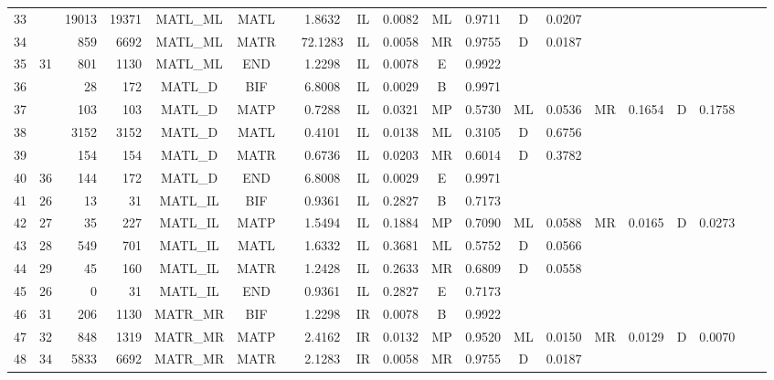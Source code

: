 \begin{table}
\begin{center}
\begin{tabular}{|rr|rr|cc|c|c|cc|cc|cc|cc|cc|cc|}
33  &    & 19013 & 19371 & MATL\_ML & MATL & & 1.8632  & IL & 0.0082 & ML & 0.9711 & D  & 0.0207 &    &        &    &  &  &  \\  
34  &    & 859   & 6692  & MATL\_ML & MATR & & 72.1283 & IL & 0.0058 & MR & 0.9755 & D  & 0.0187 &    &        &    &  &  &  \\  
35  & 31 & 801   & 1130  & MATL\_ML & END  & & 1.2298  & IL & 0.0078 & E  & 0.9922 &    &        &    &        &    &  &  &  \\  
36  &    & 28    & 172   & MATL\_D  & BIF  & & 6.8008  & IL & 0.0029 & B  & 0.9971 &    &        &    &        &    &  &  &  \\  
37  &    & 103   & 103   & MATL\_D  & MATP & & 0.7288  & IL & 0.0321 & MP & 0.5730 & ML & 0.0536 & MR & 0.1654 & D  & 0.1758 &  &  \\  
38  &    & 3152  & 3152  & MATL\_D  & MATL & & 0.4101  & IL & 0.0138 & ML & 0.3105 & D  & 0.6756 &    &        &    &  &  &  \\  
39  &    & 154   & 154   & MATL\_D  & MATR & & 0.6736  & IL & 0.0203 & MR & 0.6014 & D  & 0.3782 &    &        &    &  &  &  \\  
40  & 36 & 144   & 172   & MATL\_D  & END  & & 6.8008  & IL & 0.0029 & E  & 0.9971 &    &        &    &        &    &  &  &  \\  
41  & 26 & 13    & 31    & MATL\_IL & BIF  & & 0.9361  & IL & 0.2827 & B  & 0.7173 &    &        &    &        &    &  &  &  \\  
42  & 27 & 35    & 227   & MATL\_IL & MATP & & 1.5494  & IL & 0.1884 & MP & 0.7090 & ML & 0.0588 & MR & 0.0165 & D  & 0.0273 &  &  \\  
43  & 28 & 549   & 701   & MATL\_IL & MATL & & 1.6332  & IL & 0.3681 & ML & 0.5752 & D  & 0.0566 &    &        &    &  &  &  \\  
44  & 29 & 45    & 160   & MATL\_IL & MATR & & 1.2428  & IL & 0.2633 & MR & 0.6809 & D  & 0.0558 &    &        &    &  &  &  \\  
45  & 26 & 0     & 31    & MATL\_IL & END  & & 0.9361  & IL & 0.2827 & E  & 0.7173 &    &        &    &        &    &  &  &  \\  
46  & 31 & 206   & 1130  & MATR\_MR & BIF  & & 1.2298  & IR & 0.0078 & B  & 0.9922 &    &        &    &        &    &  &  &  \\  
47  & 32 & 848   & 1319  & MATR\_MR & MATP & & 2.4162  & IR & 0.0132 & MP & 0.9520 & ML & 0.0150 & MR & 0.0129 & D  & 0.0070 &  &  \\  
48  & 34 & 5833  & 6692  & MATR\_MR & MATR & & 2.1283  & IR & 0.0058 & MR & 0.9755 & D  & 0.0187 &    &        &    &  &  &  \\  

\end{tabular}
\end{center}
\end{table}
